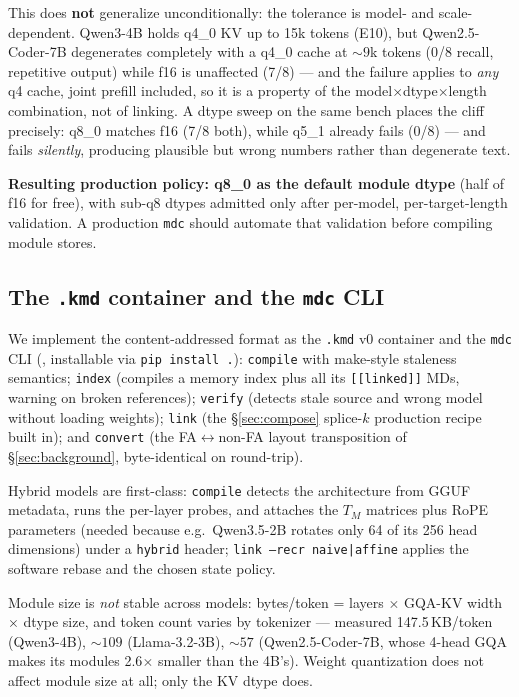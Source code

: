\documentclass[11pt]{article}
\newcommand{\kmd}{\texttt{.kmd}}
\newcommand{\mdc}{\texttt{mdc}}
\newcommand{\code}[1]{\texttt{#1}}
\begin{document}
This does \textbf{not} generalize unconditionally: the tolerance is model- and scale-dependent. Qwen3-4B holds q4\_0 KV up to 15k tokens (E10), but Qwen2.5-Coder-7B degenerates completely with a q4\_0 cache at ${\sim}9$k tokens (0/8 recall, repetitive output) while f16 is unaffected (7/8) --- and the failure applies to \emph{any} q4 cache, joint prefill included, so it is a property of the model$\times$dtype$\times$length combination, not of linking. A dtype sweep on the same bench places the cliff precisely: q8\_0 matches f16 (7/8 both), while q5\_1 already fails (0/8) --- and fails \emph{silently}, producing plausible but wrong numbers rather than degenerate text.

\textbf{Resulting production policy: q8\_0 as the default module dtype} (half of f16 for free), with sub-q8 dtypes admitted only after per-model, per-target-length validation. A production \mdc{} should automate that validation before compiling module stores.

\subsection{The \kmd{} container and the \mdc{} CLI}
\label{sec:kmd}

{\sloppy
We implement the content-addressed format as the \kmd{} v0 container and the \mdc{} CLI (, installable via \code{pip install .}): \code{compile} with make-style staleness semantics; \code{index} (compiles a memory index plus all its \code{[[linked]]} MDs, warning on broken references); \code{verify} (detects stale source and wrong model without loading weights); \code{link} (the \S\ref{sec:compose} splice-$k$ production recipe built in); and \code{convert} (the FA$\leftrightarrow$non-FA layout transposition of \S\ref{sec:background}, byte-identical on round-trip).\par}

Hybrid models are first-class: \code{compile} detects the architecture from GGUF metadata, runs the per-layer probes, and attaches the $T_M$ matrices plus RoPE parameters (needed because e.g.\ Qwen3.5-2B rotates only 64 of its 256 head dimensions) under a \code{hybrid} header; \code{link --recr naive|affine} applies the software rebase and the chosen state policy.

Module size is \emph{not} stable across models: bytes/token = layers $\times$ GQA-KV width $\times$ dtype size, and token count varies by tokenizer --- measured 147.5\,KB/token (Qwen3-4B), ${\sim}109$ (Llama-3.2-3B), ${\sim}57$ (Qwen2.5-Coder-7B, whose 4-head GQA makes its modules 2.6$\times$ smaller than the 4B's). Weight quantization does not affect module size at all; only the KV dtype does.
\end{document}
